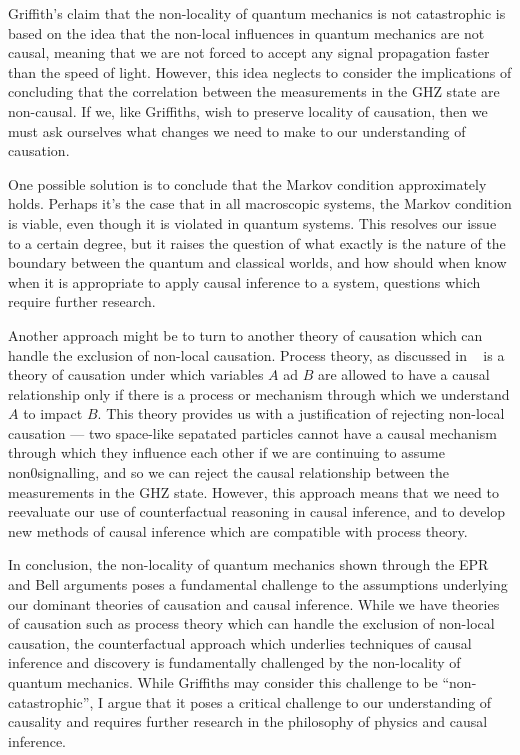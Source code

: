 \documentclass[11pt, a4paper]{article}
\begin{document}
Griffith's claim that the non-locality of quantum mechanics is not catastrophic
is based on the idea that the non-local influences in quantum mechanics are not
causal, meaning that we are not forced to accept any signal propagation faster
than the speed of light. However, this idea neglects to consider the
implications of concluding that the correlation between the measurements in the
GHZ state are non-causal. If we, like Griffiths, wish to preserve locality of
causation, then we must ask ourselves what changes we need to make to our 
understanding of causation.

One possible solution is to conclude that the Markov condition approximately 
holds. Perhaps it's the case that in all macroscopic systems, the Markov
condition is viable, even though it is violated in quantum systems. This
resolves our issue to a certain degree, but it raises the question of what
exactly is the nature of the boundary between the quantum and classical worlds,
and how should when know when it is appropriate to apply causal inference to a
system, questions which require further research.

Another approach might be to turn to another theory of causation which can
handle the exclusion of non-local causation. Process theory, as discussed in
~\cite{SEP-CausalProcesses} is a theory of causation under which variables $A$
ad $B$ are allowed to have a causal relationship only if there is a process or
mechanism through which we understand $A$ to impact $B$. This theory provides
us with a justification of rejecting non-local causation — two space-like 
sepatated particles cannot have a causal mechanism through which they influence
each other if we are continuing to assume non0signalling, and so we can reject
the causal relationship between the measurements in the GHZ state. However, this
approach means that we need to reevaluate our use of counterfactual reasoning in
causal inference, and to develop new methods of causal inference which are
compatible with process theory.

In conclusion, the non-locality of quantum mechanics shown through the 
EPR and Bell arguments poses a fundamental challenge to the assumptions
underlying our dominant theories of causation and causal inference. While we
have theories of causation such as process theory which can handle the exclusion
of non-local causation, the counterfactual approach which underlies
techniques of causal inference and discovery is fundamentally challenged by the
non-locality of quantum mechanics. While Griffiths may consider this challenge 
to be ``non-catastrophic'', I argue that it poses a critical challenge to our
understanding of causality and requires further research in the philosophy of
physics and causal inference.


\end{document}
